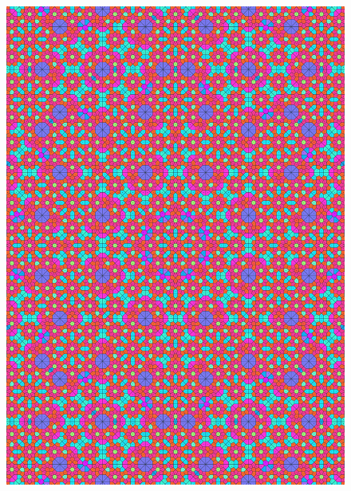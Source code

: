 \documentclass[text.tex]{subfiles}
\begin{document}
\begin{figure}[h!]
\centering
\includegraphics[width=1\textwidth]{img/results/circle8/quasi_circle_121607_(4546_-1881alpha_4).pdf}
\end{figure}
\end{document}
